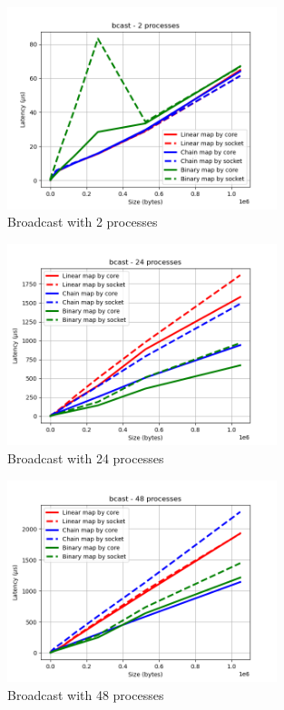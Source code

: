 \begin{figure}[h!]
    \centering
    \includegraphics[width=0.7\textwidth]{../plots/bcast_fixedProcesses2.png}
    \caption{Broadcast with 2 processes}
    \label{fig:broadcast_fixed_processes_2}
\end{figure}

\begin{figure}[h!]
    \centering
    \includegraphics[width=0.7\textwidth]{../plots/bcast_fixedProcesses24.png}
    \caption{Broadcast with 24 processes}
    \label{fig:broadcast_fixed_processes_24}
\end{figure}

\begin{figure}[h!]
    \centering
    \includegraphics[width=0.7\textwidth]{../plots/bcast_fixedProcesses48.png}
    \caption{Broadcast with 48 processes}
    \label{fig:broadcast_fixed_processes_48}
\end{figure}


